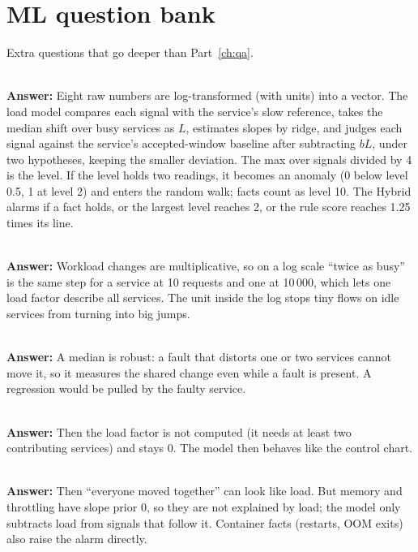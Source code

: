 \section{ML question bank}
Extra questions that go deeper than Part~\ref{ch:qa}.

\\
\textbf{Answer:} Eight raw numbers are log-transformed (with units) into a vector. The load model compares each signal with the service's slow reference, takes the median shift over busy services as $L$, estimates slopes by ridge, and judges each signal against the service's accepted-window baseline after subtracting $bL$, under two hypotheses, keeping the smaller deviation. The max over signals divided by 4 is the level. If the level holds two readings, it becomes an anomaly (0 below level 0.5, 1 at level 2) and enters the random walk; facts count as level 10. The Hybrid alarms if a fact holds, or the largest level reaches 2, or the rule score reaches 1.25 times its line.

\\
\textbf{Answer:} Workload changes are multiplicative, so on a log scale ``twice as busy'' is the same step for a service at 10 requests and one at 10\,000, which lets one load factor describe all services. The unit inside the log stops tiny flows on idle services from turning into big jumps.

\\
\textbf{Answer:} A median is robust: a fault that distorts one or two services cannot move it, so it measures the shared change even while a fault is present. A regression would be pulled by the faulty service.

\\
\textbf{Answer:} Then the load factor is not computed (it needs at least two contributing services) and stays 0. The model then behaves like the control chart.

\\
\textbf{Answer:} Then ``everyone moved together'' can look like load. But memory and throttling have slope prior 0, so they are not explained by load; the model only subtracts load from signals that follow it. Container facts (restarts, OOM exits) also raise the alarm directly.

